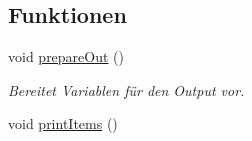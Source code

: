 \subsection*{Funktionen}
\begin{DoxyCompactItemize}
\item 
void \hyperlink{group___lend_lib_out_gae6bfc3bcebb80e387b4ad8a773496437}{prepare\+Out} ()
\begin{DoxyCompactList}\small\item\em Bereitet Variablen für den Output vor. \end{DoxyCompactList}\item 
void \hyperlink{group___lend_lib_out_ga83cb01db1bc577a2e4a54cbe62773c17}{print\+Items} ()\hypertarget{group___lend_lib_out_ga83cb01db1bc577a2e4a54cbe62773c17}{}\label{group___lend_lib_out_ga83cb01db1bc577a2e4a54cbe62773c17}


\end{DoxyCompactItemize}
